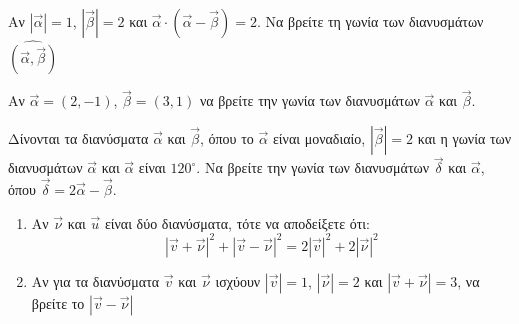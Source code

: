 \documentclass{presentation}
\begin{document}




\begin{askisi}
  Αν $|\vec{α}|=1$, $|\vec{β}|=2$ και $\vec{α}\cdot(\vec{α}-\vec{β})=2$. Να βρείτε τη γωνία των διανυσμάτων $\widehat{(\vec{α }, \vec{β })}$

\end{askisi}

\begin{askisi}
  Αν $\vec{α}=(2,-1)$, $\vec{β}=(3,1)$ να βρείτε την γωνία των διανυσμάτων $\vec{α}$ και $\vec{β}$.
\end{askisi}

\begin{askisi}
  Δίνονται τα διανύσματα $\vec{α}$ και $\vec{β}$, όπου το $\vec{α}$ είναι μοναδιαίο, $|\vec{β}|=2$ και η γωνία των διανυσμάτων $\vec{α}$ και $\vec{α}$ είναι $120^{\circ}$. Να βρείτε την γωνία των διανυσμάτων $\vec{δ}$ και $\vec{α}$, όπου $\vec{δ}=2\vec{α}-\vec{β}$.
\end{askisi}

\begin{askisi}
  \begin{enumerate}[<+->]
    \item     Αν $\vec{\nu}$ και $\vec{u}$ είναι δύο διανύσματα, τότε να αποδείξετε ότι:
          $$|\vec{v}+\vec{\nu}|^2+|\vec{v}-\vec{\nu}|^2=2|\vec{v}|^2+2|\vec{\nu}|^2$$
    \item    Αν για τα διανύσματα $\vec{v}$ και $\vec{\nu}$ ισχύουν $|\vec{v}|=1$, $|\vec{\nu}|=2$ και $|\vec{v}+\vec{\nu}|=3$, να βρείτε το $|\vec{v}-\vec{\nu}|$
  \end{enumerate}
\end{askisi}
\end{document}
